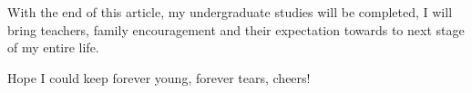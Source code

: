 With the end of this article, my undergraduate studies will be completed, I will bring teachers, family encouragement and their expectation towards to next stage of my entire life.

Hope I could keep forever young, forever tears, cheers!

\clearpage
~~\thispagestyle{empty}
\clearpage
